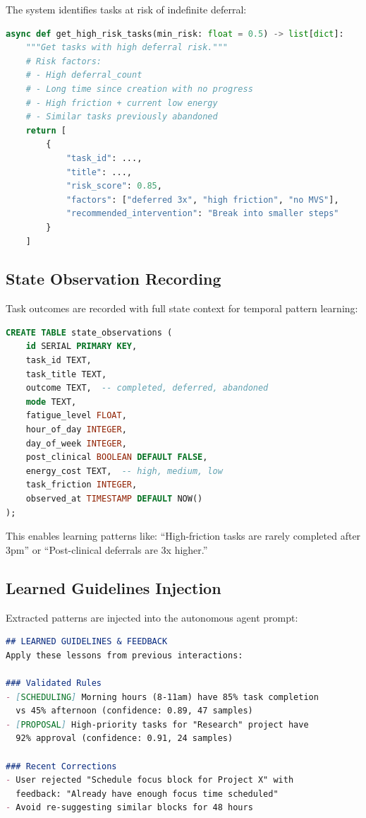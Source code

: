 \documentclass[11pt,a4paper]{article}
\begin{document}
The system identifies tasks at risk of indefinite deferral:

\begin{lstlisting}[language=Python]
async def get_high_risk_tasks(min_risk: float = 0.5) -> list[dict]:
    """Get tasks with high deferral risk."""
    # Risk factors:
    # - High deferral_count
    # - Long time since creation with no progress
    # - High friction + current low energy
    # - Similar tasks previously abandoned
    return [
        {
            "task_id": ...,
            "title": ...,
            "risk_score": 0.85,
            "factors": ["deferred 3x", "high friction", "no MVS"],
            "recommended_intervention": "Break into smaller steps"
        }
    ]
\end{lstlisting}

\subsection{State Observation Recording}

Task outcomes are recorded with full state context for temporal pattern learning:

\begin{lstlisting}[language=SQL]
CREATE TABLE state_observations (
    id SERIAL PRIMARY KEY,
    task_id TEXT,
    task_title TEXT,
    outcome TEXT,  -- completed, deferred, abandoned
    mode TEXT,
    fatigue_level FLOAT,
    hour_of_day INTEGER,
    day_of_week INTEGER,
    post_clinical BOOLEAN DEFAULT FALSE,
    energy_cost TEXT,  -- high, medium, low
    task_friction INTEGER,
    observed_at TIMESTAMP DEFAULT NOW()
);
\end{lstlisting}

This enables learning patterns like: ``High-friction tasks are rarely completed after 3pm'' or ``Post-clinical deferrals are 3x higher.''

\subsection{Learned Guidelines Injection}

Extracted patterns are injected into the autonomous agent prompt:

\begin{lstlisting}[language=markdown]
## LEARNED GUIDELINES & FEEDBACK
Apply these lessons from previous interactions:

### Validated Rules
- [SCHEDULING] Morning hours (8-11am) have 85% task completion
  vs 45% afternoon (confidence: 0.89, 47 samples)
- [PROPOSAL] High-priority tasks for "Research" project have
  92% approval (confidence: 0.91, 24 samples)

### Recent Corrections
- User rejected "Schedule focus block for Project X" with
  feedback: "Already have enough focus time scheduled"
- Avoid re-suggesting similar blocks for 48 hours
\end{lstlisting}
\end{document}

